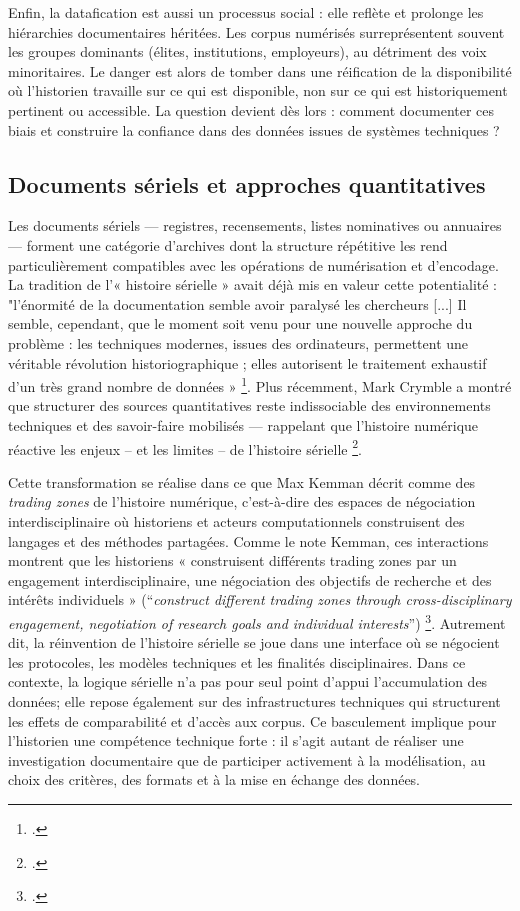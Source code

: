 Enfin, la datafication est aussi un processus social : elle reflète et prolonge les hiérarchies documentaires héritées. Les corpus numérisés surreprésentent souvent les groupes dominants (élites, institutions, employeurs), au détriment des voix minoritaires. Le danger est alors de tomber dans une réification de la disponibilité où l’historien travaille sur ce qui est disponible, non sur ce qui est historiquement pertinent ou accessible. La question devient dès lors : comment documenter ces biais et construire la confiance dans des données issues de systèmes techniques ? 

\subsection{Documents sériels et approches quantitatives}

Les documents sériels — registres, recensements, listes nominatives ou annuaires — forment une catégorie d’archives dont la structure répétitive les rend particulièrement compatibles avec les opérations de numérisation et d’encodage. La tradition de l’« histoire sérielle » avait déjà mis en valeur cette potentialité : "l’énormité de la documentation semble avoir paralysé les chercheurs [...] Il semble, cependant, que le moment soit venu pour une nouvelle approche du problème : les techniques modernes, issues des ordinateurs, permettent une véritable révolution historiographique ; elles autorisent le traitement exhaustif d’un très grand nombre de données » \footcite[][p. 8]{purentimeus}. Plus récemment, Mark Crymble a montré que structurer des sources quantitatives reste indissociable des environnements techniques et des savoir-faire mobilisés — rappelant que l’histoire numérique réactive les enjeux -- et les limites -- de l’histoire sérielle \footcite[][]{crymble}.

Cette transformation se réalise dans ce que Max Kemman décrit comme des \emph{trading zones} de l’histoire numérique, c’est-à-dire des espaces de négociation interdisciplinaire où historiens et acteurs computationnels construisent des langages et des méthodes partagées. Comme le note Kemman, ces interactions montrent que les historiens « construisent différents trading zones par un engagement interdisciplinaire, une négociation des objectifs de recherche et des intérêts individuels » (\enquote{\emph{construct different trading zones through cross-disciplinary engagement, negotiation of research goals and individual interests}}) \footcite[][p.12]{kemman}. Autrement dit, la réinvention de l’histoire sérielle se joue dans une interface où se négocient les protocoles, les modèles techniques et les finalités disciplinaires. Dans ce contexte, la logique sérielle n'a pas pour seul point d'appui l’accumulation des données; elle repose également sur des infrastructures techniques qui structurent les effets de comparabilité et d’accès aux corpus. Ce basculement implique pour l’historien une compétence technique forte : il s'agit autant de réaliser une investigation documentaire que de participer activement à la modélisation, au choix des critères, des formats et à la mise en échange des données.

